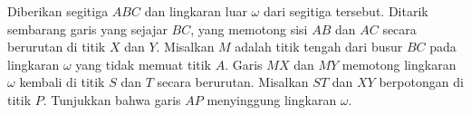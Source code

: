 Diberikan segitiga $ABC$ dan lingkaran luar $\omega$ dari segitiga tersebut. Ditarik sembarang garis yang sejajar $BC$, yang memotong sisi $AB$ dan $AC$ secara berurutan di titik $X$ dan $Y$. Misalkan $M$ adalah titik tengah dari busur $BC$ pada lingkaran $\omega$ yang tidak memuat titik $A$. Garis $MX$ dan $MY$ memotong lingkaran $\omega$ kembali di titik $S$ dan $T$ secara berurutan. Misalkan $ST$ dan $XY$ berpotongan di titik $P$. Tunjukkan bahwa garis $AP$ menyinggung lingkaran $\omega$.
